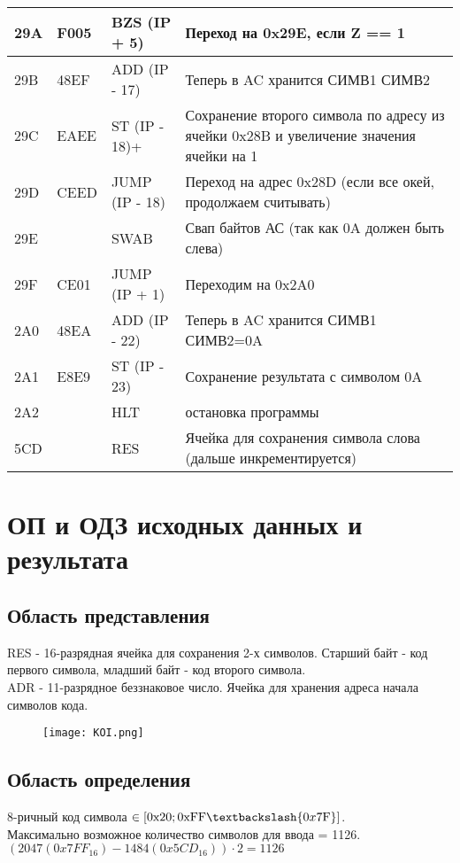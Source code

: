 \begin{longtable}{|>{\centering\arraybackslash}p{1cm}|>{\centering\arraybackslash}p{2cm}|>{\centering\arraybackslash}p{3cm}|>{\arraybackslash}p{9cm}|}
\rowcolor{green}
29A & F005 & BZS (IP + 5) & Переход на 0x29E, если Z == 1 \\\hline
29B & 48EF & ADD (IP - 17) & Теперь в AC хранится СИМВ1 СИМВ2 \\\hline
29C & EAEE & ST (IP - 18)+ & Сохранение второго символа по адресу из ячейки 0x28B и увеличение значения ячейки на 1 \\\hline
29D & CEED & JUMP (IP - 18) & Переход на адрес 0x28D (если все окей, продолжаем считывать)  \\\hline
29E & 0680 & SWAB & Свап байтов АС (так как 0A должен быть слева) \\\hline
29F & CE01 & JUMP (IP + 1) & Переходим на 0x2A0  \\\hline
2A0 & 48EA & ADD (IP - 22) & Теперь в AC хранится СИМВ1 СИМВ2=0A \\\hline
2A1 & E8E9 & ST (IP - 23) & Сохранение результата с символом 0A  \\\hline 
2A2 & 0100 & HLT & остановка программы \\\hline 
 \rowcolor{red}
5CD & 0000 & RES & Ячейка для сохранения символа слова (дальше инкрементируется) 
\end{longtable}
\section{ОП и ОДЗ исходных данных и результата}
\subsection{Область представления}
RES - 16-разрядная ячейка для сохранения 2-х символов. Старший байт - код первого символа, младший байт - код второго символа. \\
ADR - 11-разрядное беззнаковое число. Ячейка для хранения адреса начала символов кода.
\begin{figure}[H]
    \centering
    \texttt{[image: KOI.png]}
\end{figure}
\subsection{Область определения}
8-ричный код символа $\in [\text{0x20}; \text{0xFF}\textbackslash\{0x7\text{F}\}]$. \\
Максимально возможное количество символов для ввода = 1126.\\
$(2047(0x7FF_{16}) - 1484(0x5CD_{16}))\cdot2 =1126$
